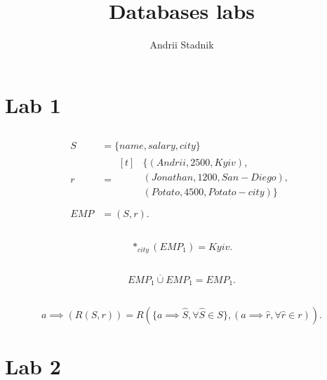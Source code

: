 \documentclass[a4paper]{article}
\title{Databases labs}
\author{Andrii Stadnik}
\begin{document}
	\maketitle
	\tableofcontents
	\section{Lab 1}
	\subsection{}
	\begin{align*}
		S &= \{name, salary, city\} \\
		r &= \begin{aligned}[t]
			&\{(Andrii, 2500, Kyiv), \\
			&(Jonathan, 1200, San-Diego), \\
			&(Potato, 4500, Potato-city)\} \\
			\end{aligned} \\
		EMP &= (S, r)
	.\end{align*}
	\subsection{}
	\[
	*_{city}(EMP_1) = Kyiv
	.\]
	\subsection{}
	\[
		EMP_1 \overline{\cup} EMP_1 = EMP_1
	.\]
	\subsection{}
	\[
		a \implies (R(S, r)) = R(\{a \implies \hat{S}, \forall \hat{S} \in S\}, (a \implies
		\hat{r}, \forall \hat{r} \in r))
	.\]
	\section{Lab 2}
\end{document}
